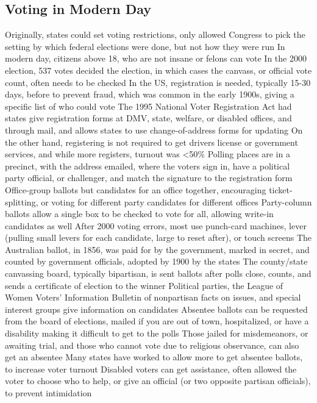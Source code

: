 \documentclass[11 pt, twoside]{article}
\newenvironment{outline*}
{
	\begin{outline}[enumerate]
	}
	{\end{outline}
}
\begin{document}
\subsection{Voting in Modern Day}
\begin{outline*}
\1 Originally, states could set voting restrictions, only allowed Congress to pick the setting by which federal elections were done, but not how they were run
\2 In modern day, citizens above 18, who are not insane or felons can vote
\2 In the 2000 election, 537 votes decided the election, in which cases the canvass, or official vote count, often needs to be checked
\1 In the US, registration is needed, typically 15-30 days, before to prevent fraud, which was common in the early 1900s, giving a specific list of who could vote
\2 The 1995 National Voter Registration Act had states give registration forms at DMV, state, welfare, or disabled offices, and through mail, and allows states to use change-of-address forms for updating
\2 On the other hand, registering is not required to get drivers license or government services, and while more registers, turnout was <50\%
\1 Polling places are in a precinct, with the address emailed, where the voters sign in, have a political party official, or challenger, and match the signature to the registration form
\2 Office-group ballots but candidates for an office together, encouraging ticket-splitting, or voting for different party candidates for different offices
\2 Party-column ballots allow a single box to be checked to vote for all, allowing write-in candidates as well
\2 After 2000 voting errors, most use punch-card machines, lever (pulling small levers for each candidate, large to reset after), or touch screens
\1 The Australian ballot, in 1856, was paid for by the government, marked in secret, and counted by government officials, adopted by 1900 by the states
\2 The county/state canvassing board, typically bipartisan, is sent ballots after polls close, counts, and sends a certificate of election to the winner
\1 Political parties, the League of Women Voters’ Information Bulletin of nonpartisan facts on issues, and special interest groups give information on candidates
\1 Absentee ballots can be requested from the board of elections, mailed if you are out of town, hospitalized, or have a disability making it difficult to get to the polls
\2 Those jailed for misdemeanors, or awaiting trial, and those who cannot vote due to religious observance, can also get an absentee
\2 Many states have worked to allow more to get absentee ballots, to increase voter turnout
\1 Disabled voters can get assistance, often allowed the voter to choose who to help, or give an official (or two opposite partisan officials), to prevent intimidation
\end{outline*}
\end{document}
